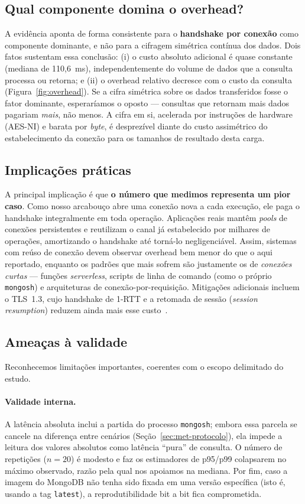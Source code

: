 \documentclass[12pt]{article}
\begin{document}
\subsection{Qual componente domina o overhead?}

A evidência aponta de forma consistente para o \textbf{handshake por conexão}
como componente dominante, e não para a cifragem simétrica contínua dos dados.
Dois fatos sustentam essa conclusão: (i) o custo absoluto adicional é quase
constante (mediana de 110,6~ms), independentemente do volume de dados que a
consulta processa ou retorna; e (ii) o overhead relativo decresce com o custo da consulta (Figura~\ref{fig:overhead}). Se a cifra
simétrica sobre os dados transferidos fosse o fator dominante, esperaríamos o
oposto --- consultas que retornam mais dados pagariam \emph{mais}, não menos.
A cifra em si, acelerada por instruções de hardware (AES-NI) e barata por
\emph{byte}, é desprezível diante do custo assimétrico do estabelecimento da
conexão para os tamanhos de resultado desta carga.

\subsection{Implicações práticas}

A principal implicação é que \textbf{o número que medimos representa um pior
caso}. Como nosso arcabouço abre uma conexão nova a cada execução, ele paga o
handshake integralmente em toda operação. Aplicações reais mantêm \emph{pools} de
conexões persistentes e reutilizam o canal já estabelecido por milhares de
operações, amortizando o handshake até torná-lo negligenciável. Assim, sistemas
com reúso de conexão devem observar overhead bem menor do que o aqui reportado,
enquanto os padrões que mais sofrem são justamente os de \emph{conexões
curtas} --- funções \emph{serverless}, scripts de linha de comando (como o próprio
\texttt{mongosh}) e arquiteturas de conexão-por-requisição. Mitigações adicionais
incluem o TLS~1.3, cujo handshake de 1-RTT e a retomada de sessão
(\emph{session resumption}) reduzem ainda mais esse custo~\cite{rescorla2018tls}.

\subsection{Ameaças à validade}

Reconhecemos limitações importantes, coerentes com o escopo delimitado do estudo.

\paragraph{Validade interna.} A latência absoluta inclui a partida do processo
\texttt{mongosh}; embora essa parcela se cancele na diferença entre cenários
(Seção~\ref{sec:met-protocolo}), ela impede a leitura dos valores absolutos como
latência ``pura'' de consulta. O número de repetições ($n=20$) é modesto e faz os
estimadores de p95/p99 colapsarem no máximo observado, razão pela qual nos
apoiamos na mediana. Por fim, caso a imagem do MongoDB não tenha sido fixada em
uma versão específica (isto é, usando a tag \texttt{latest}), a reprodutibilidade
bit a bit fica comprometida.
\end{document}
